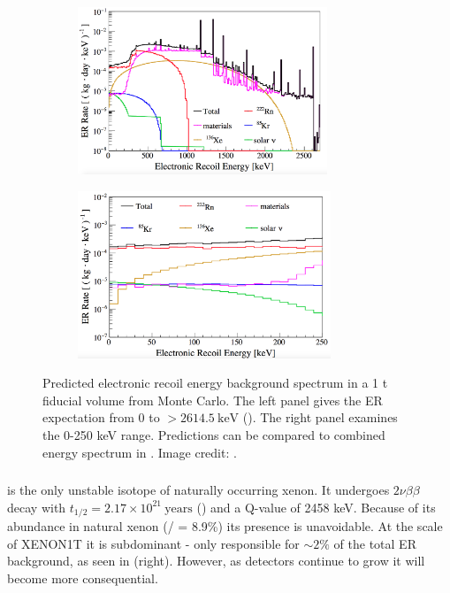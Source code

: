 \begin{figure}
    \centering
    \begin{subfigure}[t]{0.5\textwidth}
        \centering
        \includegraphics[height=5cm]{ERRateMCFull}
    \end{subfigure}%
    \begin{subfigure}[t]{0.5\textwidth}
        \centering
        \includegraphics[height=5cm]{ERRateMCZoomed}
    \end{subfigure}
    \caption{Predicted electronic recoil energy background spectrum in a 1 t fiducial volume from Monte Carlo.  The left panel gives the
    ER expectation from 0 to $> 2614.5\ \mathrm{keV}$ ().  The right panel examines the 0-250 keV range.  Predictions can
    be compared to combined energy spectrum in .  Image credit:
    .}
	\label{fig:backgrounds_er_spectrum}
\end{figure}



\subsubsection{}
\label{subsubsec:backgrounds_electronic_xe}
 is the only unstable isotope of naturally occurring xenon.  It undergoes $2 \nu \beta \beta$ decay with
$t_{1/2} = 2.17 \times 10^{21}\ \mathrm{years}$ () and a Q-value of 2458 keV.  Because of its abundance in natural
xenon (/ = 8.9\%) its presence is unavoidable.  At the scale of XENON1T it is subdominant - only responsible for
${\sim}2 \%$ of the total ER background, as seen in  (right).  However, as detectors continue to grow
it will become more consequential.



